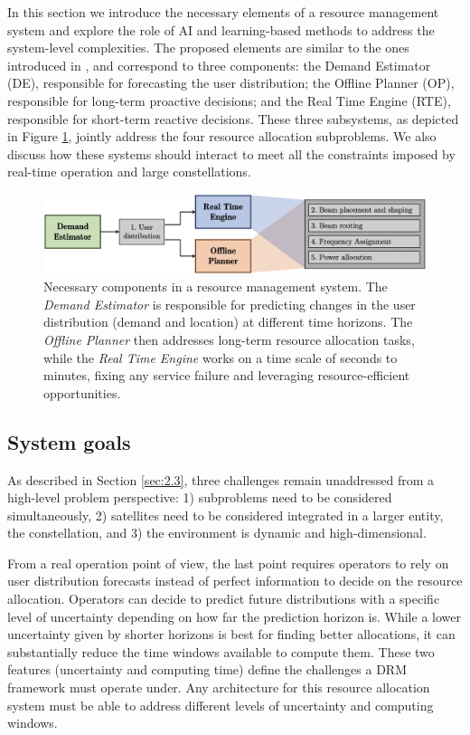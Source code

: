 \documentclass[letterpaper]{article} %
\begin{document}
In this section we introduce the necessary elements of a resource management system and explore the role of AI and learning-based methods to address the system-level complexities. The proposed elements are similar to the ones introduced in \cite{Guerster2019}, and correspond to three components: the Demand Estimator (DE), responsible for forecasting the user distribution; the Offline Planner (OP), responsible for long-term proactive decisions; and the Real Time Engine (RTE), responsible for short-term reactive decisions. These three subsystems, as depicted in Figure \ref{fig:BlockDiagram}, jointly address the four resource allocation subproblems. We also discuss how these systems should interact to meet all the constraints imposed by real-time operation and large constellations.



\begin{figure}[t]
\begin{center}
\includegraphics[width=0.8\linewidth]{pics/block_diagram.png}
\end{center}
\caption{Necessary components in a resource management system. The \textit{Demand Estimator} is responsible for predicting changes in the user distribution (demand and location) at different time horizons. The \textit{Offline Planner} then addresses long-term resource allocation tasks, while the \textit{Real Time Engine} works on a time scale of seconds to minutes, fixing any service failure and leveraging resource-efficient opportunities.}
\label{fig:BlockDiagram}
\end{figure}

\subsection{System goals}

As described in Section \ref{sec:2.3}, three challenges remain unaddressed from a high-level problem perspective: 1) subproblems need to be considered simultaneously, 2) satellites need to be considered integrated in a larger entity, the constellation, and 3) the environment is dynamic and high-dimensional.

From a real operation point of view, the last point requires operators to rely on user distribution forecasts instead of perfect information to decide on the resource allocation. Operators can decide to predict future distributions with a specific level of uncertainty depending on how far the prediction horizon is. While a lower uncertainty given by shorter horizons is best for finding better allocations, it can substantially reduce the time windows available to compute them. These two features (uncertainty and computing time) define the challenges a DRM framework must operate under. Any architecture for this resource allocation system must be able to address different levels of uncertainty and computing windows.
\end{document}
